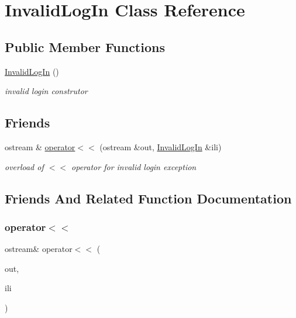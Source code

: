 \hypertarget{class_invalid_log_in}{}\section{Invalid\+Log\+In Class Reference}
\label{class_invalid_log_in}
\subsection*{Public Member Functions}
\begin{DoxyCompactItemize}
\item 
\hypertarget{class_invalid_log_in_a559c4ea40e1f43b7abce6fe4c753f6fe}{}\label{class_invalid_log_in_a559c4ea40e1f43b7abce6fe4c753f6fe} 
\hyperlink{class_invalid_log_in_a559c4ea40e1f43b7abce6fe4c753f6fe}{Invalid\+Log\+In} ()
\begin{DoxyCompactList}\small\item\em invalid login construtor \end{DoxyCompactList}\end{DoxyCompactItemize}
\subsection*{Friends}
\begin{DoxyCompactItemize}
\item 
ostream \& \hyperlink{class_invalid_log_in_a411d1f09f7d055dd9a8be918c5123fbd}{operator$<$$<$} (ostream \&out, \hyperlink{class_invalid_log_in}{Invalid\+Log\+In} \&ili)
\begin{DoxyCompactList}\small\item\em overload of $<$$<$ operator for invalid login exception \end{DoxyCompactList}\end{DoxyCompactItemize}


\subsection{Friends And Related Function Documentation}
\hypertarget{class_invalid_log_in_a411d1f09f7d055dd9a8be918c5123fbd}{}\label{class_invalid_log_in_a411d1f09f7d055dd9a8be918c5123fbd} 
\subsubsection{\texorpdfstring{operator$<$$<$}{operator<<}}
{\footnotesize\ttfamily ostream\& operator$<$$<$ (\begin{DoxyParamCaption}\item[{ostream \&}]{out,  }\item[{\hyperlink{class_invalid_log_in}{Invalid\+Log\+In} \&}]{ili }\end{DoxyParamCaption})\hspace{0.3cm}{\ttfamily [friend]}}



